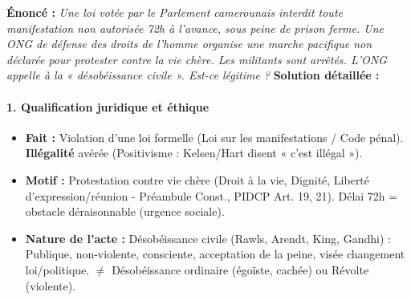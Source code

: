 \documentclass[11pt]{article}
\newcommand{\cle}[1]{{\popxbold\color{popdark}#1}}
\begin{document}
\begin{exoresolu}
    \textbf{Énoncé :} \textit{Une loi votée par le Parlement camerounais interdit toute manifestation non autorisée 72h à l'avance, sous peine de prison ferme. Une ONG de défense des droits de l'homme organise une marche pacifique non déclarée pour protester contre la vie chère. Les militants sont arrêtés. L'ONG appelle à la « désobéissance civile ». Est-ce légitime ?}
    \tcblower
    \textbf{Solution détaillée :}
    \paragraph{1. Qualification juridique et éthique}
    \begin{itemize}
        \item \textbf{Fait :} Violation d'une loi formelle (Loi sur les manifestations / Code pénal). \textbf{Illégalité} avérée (Positivisme : Kelsen/Hart disent « c'est illégal »).
        \item \textbf{Motif :} Protestation contre vie chère (Droit à la vie, Dignité, Liberté d'expression/réunion - Préambule Const., PIDCP Art. 19, 21). Délai 72h = obstacle déraisonnable (urgence sociale).
        \item \textbf{Nature de l'acte :} \cle{Désobéissance civile} (Rawls, Arendt, King, Gandhi) : Publique, non-violente, consciente, acceptation de la peine, visée changement loi/politique. $\neq$ Désobéissance ordinaire (égoïste, cachée) ou Révolte (violente).
    \end{itemize}

\end{exoresolu}
\end{document}
